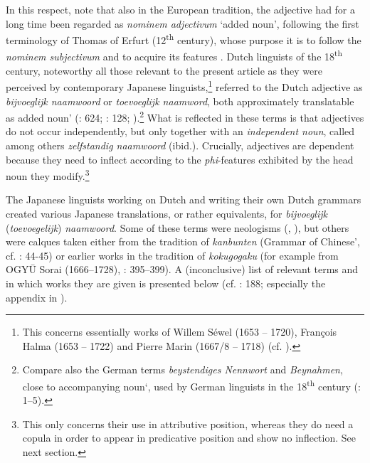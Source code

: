 \documentclass[output=paper]{langscibook}
\begin{document}
In this respect, note that also in the European tradition, the adjective had for a long time been regarded as \textit{nominem adjectivum} ‘added noun’, following the first terminology of Thomas of Erfurt (12\textsuperscript{th} century), whose purpose it is to follow the \textit{nominem subjectivum} and to acquire its features \citep{Hajek2004}. Dutch linguists of the 18\textsuperscript{th} century, noteworthy all those relevant to the present article as they were perceived by contemporary Japanese linguists,\footnote{This concerns essentially works of Willem Séwel (1653 – 1720), François Halma (1653 – 1722) and Pierre Marin (1667/8 – 1718) (cf. \citealt{Nespoli2023}).} referred to the Dutch adjective as \textit{bijvoeglijk naamwoord} or \textit{toevoeglijk naamword}, both approximately translatable as {\textasciigrave}added noun’ (\citealt{Sugimoto1991}: 624; \citealt{Kim2006}: 128; \citealt{Nespoli2023}).\footnote{Compare also the German terms \textit{beystendiges Nennwort} and \textit{Beynahmen}, close to {\textasciigrave}accompanying noun‘, used by German linguists in the 18\textsuperscript{th} century (\citealt{Spitzl-Dupic2011}: 1–5).} What is reflected in these terms is that adjectives do not occur independently, but only together with an \textit{independent noun}, called among others \textit{zelfstandig naamwoord} (ibid.). Crucially, adjectives are dependent because they need to inflect according to the \textit{phi}{}-features exhibited by the head noun they modify.\footnote{This only concerns their use in attributive position, whereas they do need a copula in order to appear in predicative position and show no inflection. See next section.}



The Japanese linguists working on Dutch and writing their own Dutch grammars created various Japanese translations, or rather equivalents, for \textit{bijvoeglijk} (\textit{toevoegelijk}) \textit{naamwoord}. Some of these terms were neologisms (\citealt{Kim2006}, \citealt{Sugimoto1991}), but others were calques taken either from the tradition of \textit{kanbunten} ({\textasciigrave}Grammar of Chinese’, cf. \citealt{Sugimoto1991}: 44-45) or earlier works in the tradition of \textit{kokugogaku} (for example from OGYŪ Sorai (1666–1728), \citealt{Nespoli2023}: 395–399). A (inconclusive) list of relevant terms and in which works they are given is presented below (cf. \citealt{Köhlich2020}: 188; especially the appendix in \citealt{Sugimoto1991}).
\end{document}

